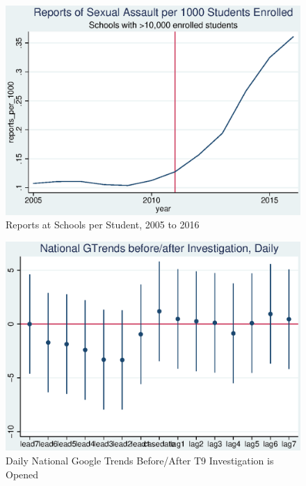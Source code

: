 \documentclass[AER]{AEA}
\begin{document}



\clearpage
\appendix


\begin{figure}

\includegraphics[]{figures/school_reports.eps}

\caption{Reports at Schools per Student, 2005 to 2016}
\end{figure}

\begin{figure}
\includegraphics[]{figures/national_trend_cases.eps}

\caption{Daily National Google Trends Before/After T9 Investigation is Opened}
\end{figure}
\end{document}
